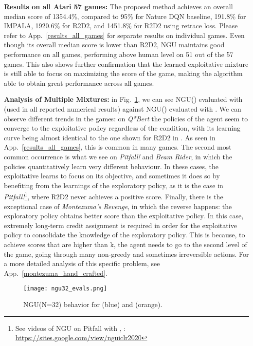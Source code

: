 \documentclass{article} \usepackage{iclr2020_conference,times}
\begin{document}
{\bf Results on all Atari 57 games: }
The proposed method achieves an overall median score of 1354.4\%, compared to 
95\% for Nature DQN baseline, 191.8\% for IMPALA, 1920.6\% for R2D2, and 1451.8\% for R2D2 using retrace loss.
Please refer to App.~\ref{results_all_games} for separate results on individual games. Even though its overall median score is lower than R2D2, NGU maintains good performance on all games, performing above human level on 51 out of the 57 games. This also shows further confirmation that the learned exploitative mixture is still able to focus on maximizing the score of the game, making the algorithm able to obtain great performance across all games.

{\bf Analysis of Multiple Mixtures:} in Fig.~\ref{ngu_evals_graph}, we can see NGU() evaluated with  (used in all reported numerical results) against NGU() evaluated with . We can observe different trends in the games: on \textit{Q*Bert} the policies of the agent seem to converge to the exploitative policy regardless of the  condition, with its learning curve being almost identical to the one shown for R2D2 in \citet{r2d2}. As seen in App.~\ref{results_all_games}, this is common in many games. The second most common occurrence is what we see on \textit{Pitfall!} and \textit{Beam Rider}, in which the policies quantitatively learn very different behaviour.
In these cases, the exploitative learns to focus on its objective, and sometimes it does so by benefiting from the learnings of the exploratory policy, as it is the case in \textit{Pitfall!}\footnote{See videos of NGU on Pitfall with , : \url{https://sites.google.com/view/nguiclr2020}}, where R2D2 never achieves a positive score. Finally, there is the exceptional case of \textit{Montezuma's Revenge}, in which the reverse happens: the exploratory policy obtains better score than the exploitative policy. In this case, extremely long-term credit assignment is required in order for the exploitative policy to consolidate the knowledge of the exploratory policy. This is because, to achieve scores that are higher than k, the agent needs to go to the second level of the game, going through many non-greedy and sometimes irreversible actions. For a more detailed analysis of this specific problem, see App.~\ref{montezuma_hand_crafted}.

\begin{figure}
    \centering
        \texttt{[image: ngu32\_evals.png]}  
        \caption{NGU(N=32) behavior for  (blue) and  (orange).} 
        \label{ngu_evals_graph}
\vspace{-2ex}
\end{figure}
\end{document}
